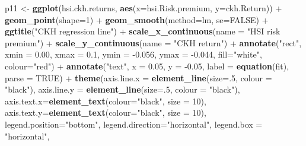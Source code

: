 \documentclass[]{article}
\newenvironment{Shaded}{\begin{snugshade}}{\end{snugshade}}
\newcommand{\KeywordTok}[1]{\textcolor[rgb]{0.13,0.29,0.53}{\textbf{{#1}}}}
\newcommand{\DataTypeTok}[1]{\textcolor[rgb]{0.13,0.29,0.53}{{#1}}}
\newcommand{\DecValTok}[1]{\textcolor[rgb]{0.00,0.00,0.81}{{#1}}}
\newcommand{\FloatTok}[1]{\textcolor[rgb]{0.00,0.00,0.81}{{#1}}}
\newcommand{\StringTok}[1]{\textcolor[rgb]{0.31,0.60,0.02}{{#1}}}
\newcommand{\OtherTok}[1]{\textcolor[rgb]{0.56,0.35,0.01}{{#1}}}
\newcommand{\NormalTok}[1]{{#1}}
\begin{document}
\begin{Shaded}
\begin{Highlighting}[]
\NormalTok{p11 <-}\StringTok{ }\KeywordTok{ggplot}\NormalTok{(hsi.ckh.returns, }\KeywordTok{aes}\NormalTok{(}\DataTypeTok{x=}\NormalTok{hsi.Risk.premium, }\DataTypeTok{y=}\NormalTok{ckh.Return)) +}\StringTok{ }\KeywordTok{geom_point}\NormalTok{(}\DataTypeTok{shape=}\DecValTok{1}\NormalTok{) +}\StringTok{ }\KeywordTok{geom_smooth}\NormalTok{(}\DataTypeTok{method=}\NormalTok{lm, }\DataTypeTok{se=}\OtherTok{FALSE}\NormalTok{) +}
\StringTok{  }\KeywordTok{ggtitle}\NormalTok{(}\StringTok{"CKH regression line"}\NormalTok{) +}
\StringTok{  }\KeywordTok{scale_x_continuous}\NormalTok{(}\DataTypeTok{name =} \StringTok{"HSI risk premium"}\NormalTok{) +}
\StringTok{  }\KeywordTok{scale_y_continuous}\NormalTok{(}\DataTypeTok{name =} \StringTok{"CKH return"}\NormalTok{) +}
\StringTok{  }\KeywordTok{annotate}\NormalTok{(}\StringTok{"rect"}\NormalTok{, }\DataTypeTok{xmin =} \FloatTok{0.00}\NormalTok{, }\DataTypeTok{xmax =} \FloatTok{0.1}\NormalTok{, }\DataTypeTok{ymin =} \NormalTok{-}\FloatTok{0.056}\NormalTok{, }\DataTypeTok{ymax =} \NormalTok{-}\FloatTok{0.044}\NormalTok{, }\DataTypeTok{fill=}\StringTok{"white"}\NormalTok{, }\DataTypeTok{colour=}\StringTok{"red"}\NormalTok{) +}\StringTok{ }
\StringTok{  }\KeywordTok{annotate}\NormalTok{(}\StringTok{"text"}\NormalTok{, }\DataTypeTok{x =} \FloatTok{0.05}\NormalTok{, }\DataTypeTok{y =} \NormalTok{-}\FloatTok{0.05}\NormalTok{, }\DataTypeTok{label =} \KeywordTok{equation}\NormalTok{(fit), }\DataTypeTok{parse =} \OtherTok{TRUE}\NormalTok{) +}\StringTok{ }
\StringTok{  }\KeywordTok{theme}\NormalTok{(}\DataTypeTok{axis.line.x =} \KeywordTok{element_line}\NormalTok{(}\DataTypeTok{size=}\NormalTok{.}\DecValTok{5}\NormalTok{, }\DataTypeTok{colour =} \StringTok{"black"}\NormalTok{), }
    \DataTypeTok{axis.line.y =} \KeywordTok{element_line}\NormalTok{(}\DataTypeTok{size=}\NormalTok{.}\DecValTok{5}\NormalTok{, }\DataTypeTok{colour =} \StringTok{"black"}\NormalTok{),     }
    \DataTypeTok{axis.text.x=}\KeywordTok{element_text}\NormalTok{(}\DataTypeTok{colour=}\StringTok{"black"}\NormalTok{, }\DataTypeTok{size =} \DecValTok{10}\NormalTok{), }
    \DataTypeTok{axis.text.y=}\KeywordTok{element_text}\NormalTok{(}\DataTypeTok{colour=}\StringTok{"black"}\NormalTok{, }\DataTypeTok{size =} \DecValTok{10}\NormalTok{), }
    \DataTypeTok{legend.position=}\StringTok{"bottom"}\NormalTok{, }
    \DataTypeTok{legend.direction=}\StringTok{"horizontal"}\NormalTok{,}
    \DataTypeTok{legend.box =} \StringTok{"horizontal"}\NormalTok{, }

\end{Highlighting}
\end{Shaded}
\end{document}
